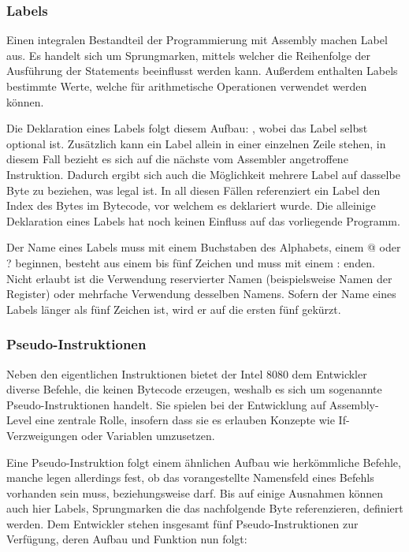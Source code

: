 \subsubsection{Labels}\label{chap:labels}

Einen integralen Bestandteil der Programmierung mit Assembly machen \glqq Label\grqq{} aus. Es handelt sich um Sprungmarken, mittels welcher die Reihenfolge der Ausführung der Statements beeinflusst werden kann. Außerdem enthalten Labels bestimmte Werte, welche für arithmetische Operationen verwendet werden können.

Die Deklaration eines Labels folgt diesem Aufbau: , wobei das Label selbst optional ist. Zusätzlich kann ein Label allein in einer einzelnen Zeile stehen, in diesem Fall bezieht es sich auf die nächste vom Assembler angetroffene Instruktion. Dadurch ergibt sich auch die Möglichkeit mehrere Label auf dasselbe Byte zu beziehen, was legal ist. In all diesen Fällen referenziert ein Label den Index des Bytes im Bytecode, vor welchem es deklariert wurde. Die alleinige Deklaration eines Labels hat noch keinen Einfluss auf das vorliegende Programm.

Der Name eines Labels muss mit einem Buchstaben des Alphabets, einem \glqq @\grqq{} oder \glqq ?\grqq{} beginnen, besteht aus einem bis fünf Zeichen und muss mit einem  \glqq :\grqq{} enden. Nicht erlaubt ist die Verwendung reservierter Namen (beispielsweise Namen der Register) oder mehrfache Verwendung desselben Namens. Sofern der Name eines Labels länger als fünf Zeichen ist, wird er auf die ersten fünf gekürzt.

\subsubsection{Pseudo-Instruktionen}\label{chap:pseudo-instructions}

Neben den eigentlichen Instruktionen bietet der Intel 8080 dem Entwickler diverse Befehle, die keinen Bytecode erzeugen, weshalb es sich um sogenannte \glqq Pseudo-Instruktionen\grqq{} handelt. Sie spielen bei der Entwicklung auf Assembly-Level eine zentrale Rolle, insofern dass sie es erlauben Konzepte wie If-Verzweigungen oder Variablen umzusetzen.

Eine Pseudo-Instruktion folgt einem ähnlichen Aufbau wie herkömmliche Befehle, manche legen allerdings fest, ob das vorangestellte Namensfeld eines Befehls vorhanden sein muss, beziehungsweise darf. Bis auf einige Ausnahmen können auch hier Labels, Sprungmarken die das nachfolgende Byte referenzieren, definiert werden. Dem Entwickler stehen insgesamt fünf Pseudo-Instruktionen zur Verfügung, deren Aufbau und Funktion nun folgt:
\linebreak

